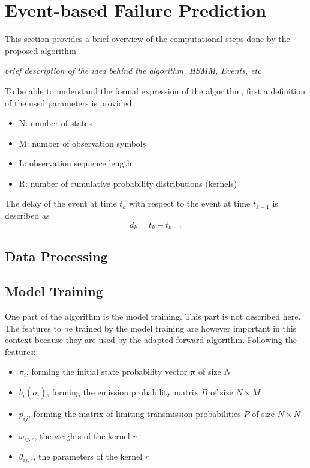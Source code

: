 \documentclass[mscthesis]{usiinfthesis}
\begin{document}
\chapter{Event-based Failure Prediction}
\label{ch:event}

This section provides a brief overview of the computational steps done by the
proposed algorithm \cite{salfner08}.

\emph{\color{red}brief description of the idea behind the algorithm, HSMM, Events, etc}

To be able to understand the formal expression of the algorithm, first
a definition of the used parameters is provided.
\begin{itemize}
    \item N: number of states
    \item M: number of observation symbols
    \item L: observation sequence length
    \item R: number of cumulative probability distributions (kernels)
\end{itemize}
The delay of the event at time $ t_k $ with respect to the event at time
$ t_{k-1} $ is described as
\begin{equation}
\label{eq:delay}
    d_k = t_k-t_{k-1}
\end{equation}

\section{Data Processing}
\label{ch:event_data}

\section{Model Training}
\label{ch:event_train}

One part of the algorithm is the model training. This part is not described
here. The features to be trained by the model training are however important
in this context because they are used by the adapted forward algorithm.
Following the features:
\begin{itemize}
    \item $ \pi_i $, forming the initial state probability vector
        $ \boldsymbol{\pi} $ of size $ N $
    \item $ b_i(o_j) $, forming the emission probability matrix $ B $ of size
        $ N \times M $
    \item $ p_{ij} $, forming the matrix of limiting transmission probabilities
        $ P $ of size $ N \times N $
    \item $ \omega_{ij, r} $, the weights of the kernel $ r $
    \item $ \theta_{ij, r} $, the parameters of the kernel $ r $
\end{itemize}
\end{document}

